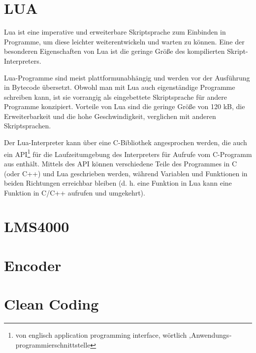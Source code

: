 \section{LUA}

Lua ist eine imperative und erweiterbare Skriptsprache zum Einbinden in Programme, um diese leichter weiterentwickeln und warten zu können. Eine der besonderen Eigenschaften von Lua ist die geringe Größe des kompilierten Skript-Interpreters.

Lua-Programme sind meist plattformunabhängig und werden vor der Ausführung in Bytecode übersetzt. Obwohl man mit Lua auch eigenständige Programme schreiben kann, ist sie vorrangig als eingebettete Skriptsprache für andere Programme konzipiert. Vorteile von Lua sind die geringe Größe von 120 kB, die Erweiterbarkeit und die hohe Geschwindigkeit, verglichen mit anderen Skriptsprachen.

Der Lua-Interpreter kann über eine C-Bibliothek angesprochen werden, die auch ein API\footnote{von englisch application programming interface, wörtlich ‚Anwendungs­programmier­schnittstelle} für die Laufzeitumgebung des Interpreters für Aufrufe vom C-Programm aus enthält. Mittels des API können verschiedene Teile des Programmes in C (oder C++) und Lua geschrieben werden, während Variablen und Funktionen in beiden Richtungen erreichbar bleiben (d. h. eine Funktion in Lua kann eine Funktion in C/C++ aufrufen und umgekehrt).

\section{LMS4000}

\section{Encoder}

\section{Clean Coding}


